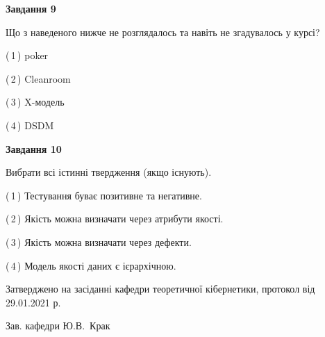 \documentclass[10pt, ukrainian]{article}
\begin{document}
{\begin {large}
{\begin {center}\textbf{Завдання 9}\end {center}}\par
Що з наведеного нижче не розглядалось та навіть не згадувалось у курсі?\par
\vspace{2mm}



(\,1\,) poker%



(\,2\,) Cleanroom%



(\,3\,) X-модель%



(\,4\,) DSDM%


{\begin {center}\textbf{Завдання 10}\end {center}}\par
Вибрати всі істинні твердження (якщо існують).\par
\vspace{2mm}



(\,1\,) Тестування буває позитивне та негативне.%



(\,2\,) Якість можна визначати через атрибути якості.%



(\,3\,) Якість можна визначати через дефекти.%



(\,4\,) Модель якості даних є ієрархічною.%



\end {large}}
{\vspace{5mm}\smallskip \begin {small} Затверджено на засіданні кафедри теоретичної кібернетики, протокол  від   29.01.2021 р.\par\smallskip\smallskip
{\parbox {6.5 cm}{Зав. кафедри \dotfill Ю.В.~Крак}} \end{small}}
\newpage
\end{document}
